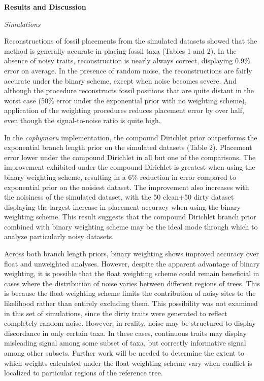 \documentclass[12pt]{article}
\begin{document}
\noindent\textbf{Results and Discussion}

\noindent\emph{Simulations}

Reconstructions of fossil placements from the simulated datasets showed
that the method is generally accurate in placing fossil taxa (Tables 1 and 2).
In the absence of noisy traits, reconstruction is nearly always correct,
displaying 0.9\% error  on average. In the presence of random
noise, the reconstructions are fairly accurate under the binary scheme, except when noise
becomes severe. And although the procedure
reconstructs fossil positions that are quite distant in the worst case (50\% error under the exponential prior with no weighting scheme),
application of the weighting procedures reduces placement error by over half, even though
the signal-to-noise ratio is quite high.

In the \emph{cophymaru} implementation, the compound Dirichlet prior
outperforms the exponential branch length prior on the simulated datasets (Table 2).
Placement error  lower under the compound Dirichlet in all but one of the comparisons. The improvement
exhibited under the compound Dirichlet is greatest when using the binary weighting scheme,
resulting in a  6\% reduction in error compared to exponential prior on the noisiest dataset.
 The improvement also increases with the noisiness of the simulated 
dataset, with the 50 clean+50 dirty dataset displaying the largest increase in placement accuracy when using the binary weighting scheme.
This result suggests that the compound Dirichlet branch prior combined with  binary weighting scheme
may be the ideal mode through which to analyze particularly noisy datasets.

Across both branch length priors, binary weighting shows improved accuracy over float and
unweighted analyses. However, despite the apparent advantage of binary
weighting, it is possible that the float weighting scheme could remain
beneficial in cases where the distribution of noise varies between
different regions of trees. This is because the float weighting scheme
limits the contribution of noisy sites to the likelihood rather than
entirely excluding them. This possibility was not examined in this set
of simulations, since the dirty traits were generated to reflect
completely random noise. However, in reality, noise may be structured to
display discordance in only certain taxa. In these cases, continuous traits may display misleading
signal among some subset of taxa, but correctly informative signal among
other subsets. Further work will be needed to determine the extent to which 
weights calculated under the float weighting scheme vary when conflict is 
localized to particular regions of the reference tree.
\end{document}
